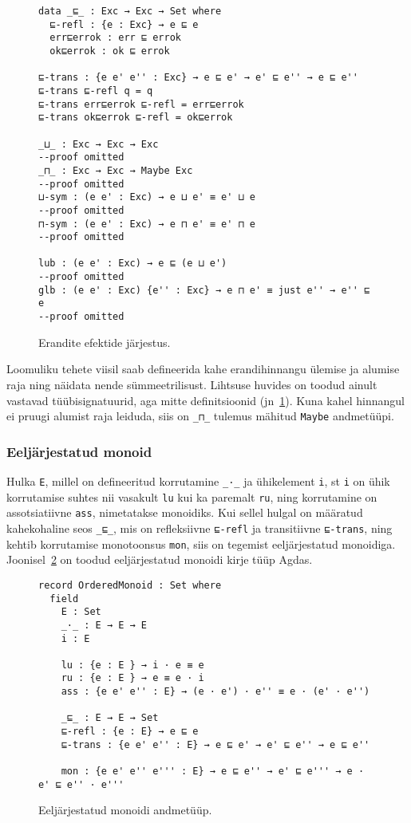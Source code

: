 \documentclass[a4paper,12pt]{article}
\begin{document}
\begin{figure}
  \begin{BVerbatim}
data _⊑_ : Exc → Exc → Set where
  ⊑-refl : {e : Exc} → e ⊑ e
  err⊑errok : err ⊑ errok
  ok⊑errok : ok ⊑ errok
  
⊑-trans : {e e' e'' : Exc} → e ⊑ e' → e' ⊑ e'' → e ⊑ e''
⊑-trans ⊑-refl q = q
⊑-trans err⊑errok ⊑-refl = err⊑errok
⊑-trans ok⊑errok ⊑-refl = ok⊑errok

_⊔_ : Exc → Exc → Exc
--proof omitted
_⊓_ : Exc → Exc → Maybe Exc
--proof omitted
⊔-sym : (e e' : Exc) → e ⊔ e' ≡ e' ⊔ e
--proof omitted
⊓-sym : (e e' : Exc) → e ⊓ e' ≡ e' ⊓ e
--proof omitted
  
lub : (e e' : Exc) → e ⊑ (e ⊔ e')
--proof omitted
glb : (e e' : Exc) {e'' : Exc} → e ⊓ e' ≡ just e'' → e'' ⊑ e
--proof omitted
  \end{BVerbatim}
  \caption{Erandite efektide järjestus.}
  \label{fig:exc.ord}
\end{figure}
Loomuliku tehete viisil saab defineerida kahe erandihinnangu ülemise ja alumise raja ning näidata nende sümmeetrilisust.
Lihtsuse huvides on toodud ainult vastavad tüübisignatuurid, aga mitte definitsioonid (jn~\ref{fig:exc.ord}).
Kuna kahel hinnangul ei pruugi alumist raja leiduda, siis on {\tt _⊓_} tulemus mähitud {\tt Maybe} andmetüüpi.

\subsubsection{Eeljärjestatud monoid}\label{sssec:ordered-monoid}
Hulka {\tt E}, millel on defineeritud korrutamine {\tt _·_} ja ühikelement {\tt i},
st {\tt i} on ühik korrutamise suhtes nii vasakult {\tt lu} kui ka paremalt {\tt ru},
ning korrutamine on assotsiatiivne {\tt ass}, nimetatakse monoidiks.
Kui sellel hulgal on määratud kahekohaline seos {\tt _⊑_},
mis on refleksiivne {\tt ⊑-refl} ja transitiivne {\tt ⊑-trans},
ning kehtib korrutamise monotoonsus {\tt mon},
siis on tegemist eeljärjestatud monoidiga.
Joonisel~\ref{fig:ordered-monoid} on toodud eeljärjestatud monoidi kirje tüüp Agdas.

\begin{figure}
  \begin{BVerbatim}
record OrderedMonoid : Set where
  field
    E : Set
    _·_ : E → E → E    
    i : E

    lu : {e : E } → i · e ≡ e
    ru : {e : E } → e ≡ e · i 
    ass : {e e' e'' : E} → (e · e') · e'' ≡ e · (e' · e'')
    
    _⊑_ : E → E → Set    
    ⊑-refl : {e : E} → e ⊑ e
    ⊑-trans : {e e' e'' : E} → e ⊑ e' → e' ⊑ e'' → e ⊑ e''

    mon : {e e' e'' e''' : E} → e ⊑ e'' → e' ⊑ e''' → e · e' ⊑ e'' · e'''
  \end{BVerbatim}
  \caption{Eeljärjestatud monoidi andmetüüp.}
  \label{fig:ordered-monoid}
\end{figure}
\end{document}
